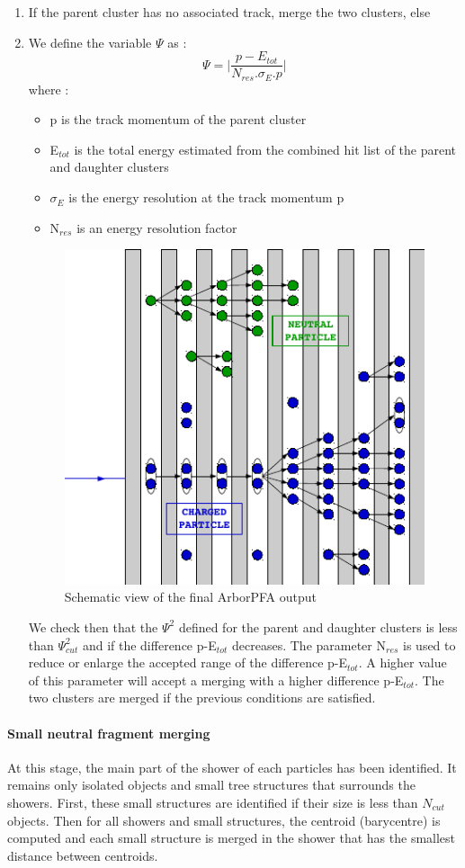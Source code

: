 \documentclass[cits]{JINST}
\begin{document}
\begin{enumerate}
  \item If the parent cluster has no associated track, merge the two clusters, else
  \item We define the variable $\Psi$ as :
  \begin{equation}
    \label{CHI2_ALGORITHM_EQUATION}
    \Psi = \Big| \frac{p-E_{tot}}{N_{res} . \sigma_E . p} \Big|
  \end{equation}
  where :
  \begin{itemize}
    \item p is the track momentum of the parent cluster
    \item E$_{tot}$ is the total energy estimated from the combined hit list of the parent and daughter clusters
    \item $\sigma_E$ is the energy resolution at the track momentum p 
    \item N$_{res}$ is an energy resolution factor
  \end{itemize}
  
\begin{figure}[!h]
  \begin{center}
    \includegraphics[width=0.4\linewidth]{PfoCreation.pdf}
  \end{center}
  \caption{\label{ARBOR_PFO_CREATION} Schematic view of the final ArborPFA output}
\end{figure}

We check then that the $\Psi^2$ defined for the parent and daughter clusters is less than $\Psi^2_{cut}$ and if the difference p-E$_{tot}$ decreases. The parameter N$_{res}$ is used to reduce or enlarge the accepted range of the difference p-E$_{tot}$. A higher value of this parameter will accept a merging with a higher difference p-E$_{tot}$. The two clusters are merged if the previous  conditions are satisfied.

\end{enumerate}

\paragraph*{Small neutral fragment merging} At this stage, the main part of the shower of each particles has been identified. It remains only isolated objects and small tree structures that surrounds the showers. First, these small structures are identified if their size is less than $N_{cut}$ objects. Then for all showers and small structures, the centroid (barycentre) is computed and each small structure is merged in the shower that has the smallest distance between centroids.
\end{document}
